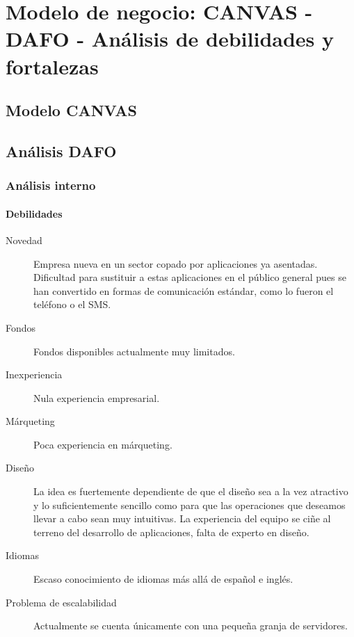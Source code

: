 \documentclass[11pt,leqno]{article}
\begin{document}
\section{Modelo de negocio: CANVAS - DAFO - Análisis de debilidades y fortalezas}


\subsection{Modelo CANVAS}

\noindent{}

\newpage
\subsection{Análisis DAFO}
\label{ssec:DAFO}

\subsubsection{Análisis interno}

\paragraph{Debilidades}
\begin{description}
	\item[Novedad] Empresa nueva en un sector copado por aplicaciones ya asentadas. 
	Dificultad para sustituir a estas aplicaciones en el público general pues se 
	han convertido en formas de comunicación estándar, como lo fueron el teléfono
	o el SMS.
	\item[Fondos] Fondos disponibles actualmente muy
	limitados. 
	\item[Inexperiencia]	Nula experiencia empresarial. 
	\item[Márqueting] Poca experiencia en márqueting. 
	\item[Diseño] La idea es fuertemente dependiente de que el diseño sea a
	la vez atractivo y lo suficientemente sencillo como para que las operaciones
	que deseamos llevar a cabo sean muy intuitivas. La experiencia
	del equipo se ciñe al terreno del desarrollo de aplicaciones, 
	falta de experto en diseño.
	\item[Idiomas] Escaso conocimiento de idiomas más allá de español e
	inglés.
	\item[Problema de escalabilidad] Actualmente se cuenta únicamente con una pequeña
	granja de servidores.
\end{description}	
\end{document}
